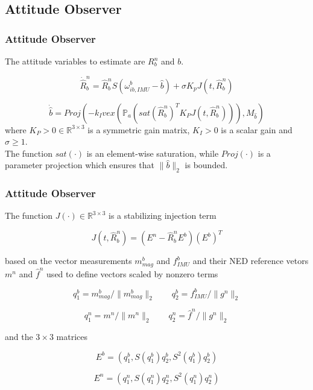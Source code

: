 \documentclass{beamer}
\begin{document}
    \subsection{Attitude Observer}
	\begin{frame}
		\frametitle{Attitude Observer}
		The attitude variables to estimate are $R^n_b$ and $b$.
		
		\[ \dot{\hat{R}}^n_b  =  \hat{R}^n_b S(\omega^b_{ib,IMU} - \hat{b}) + \sigma K_pJ(t, \hat{R}^n_b)       \]
		
		\[ \dot{\hat{b}} = Proj(-k_I vex(\mathds{P}_a (sat(\hat{R}^n_b)^T K_P J(t, \hat{R}^n_b))),M_{\hat{b}} )           \]\newline
		where $K_P > 0 \in \mathds{R}^{3\times 3}$ is a symmetric gain matrix, $K_I > 0$ is a scalar gain and $\sigma \geq 1$.\\ 
		
		The function $sat(\cdot)$ is an element-wise saturation, while $Proj(\cdot)$ is a parameter projection which ensures that $\|\hat{b} \|_2$ is bounded.
	\end{frame}
	\begin{frame}
 		\frametitle{Attitude Observer}
 		The function $J(\cdot) \in  \mathds{R}^{3\times 3}$ is a stabilizing injection term
 		
 		\[ J(t, \hat{R}^n_b)  = (E^n - \hat{R}^n_b E^b)(E^b)^T    \]
 		
 		based on the vector measurements $m^b_{mag}$ and $f^b_{IMU}$  and their NED reference vetors $m^n$ and $\hat{f}^n$ used to define vectors scaled by nonzero terms
 		
 		\[ q_1^b = m^b_{mag}/\|m^b_{mag}\|_2 \qquad q_2^b = f^b_{IMU}/\|g^n\|_2    \]
 		
 		\[ q_1^n = m^n/\|m^n\|_2 \qquad q_2^n = \hat{f}^n/\|g^n\|_2    \]
 		
 		and the $3\times3$ matrices
 		
 		\[ E^b = (q_1^b, S(q^b_1)q_2^b, S^2(q_1^b)q_2^b)    \]
 		
 		\[ E^n = (q_1^n, S(q^n_1)q_2^n, S^2(q_1^n)q_2^n)    \]
	\end{frame}
\end{document}
